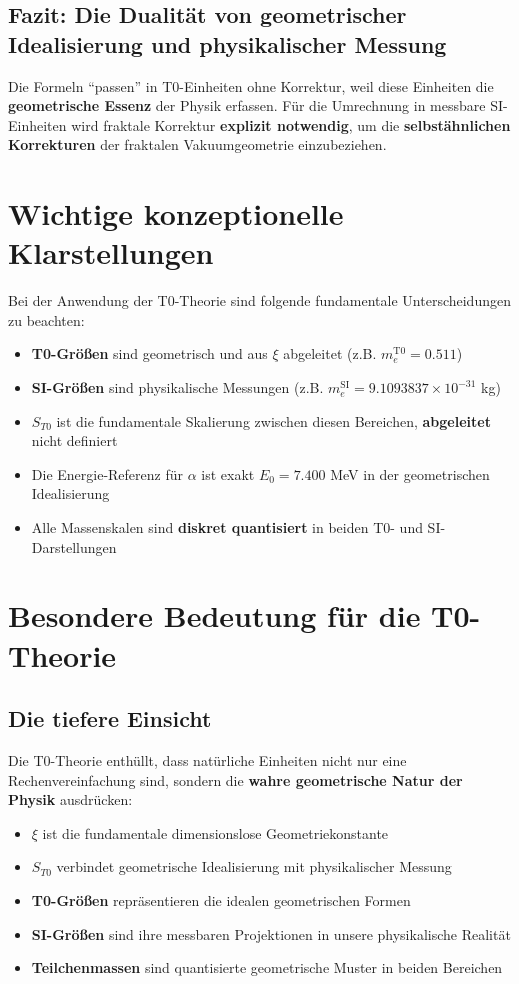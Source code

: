 	\subsection{Fazit: Die Dualität von geometrischer Idealisierung und physikalischer Messung}
	
	Die Formeln ``passen'' in T0-Einheiten ohne Korrektur, weil diese Einheiten die \textbf{geometrische Essenz} der Physik erfassen. Für die Umrechnung in messbare SI-Einheiten wird fraktale Korrektur \textbf{explizit notwendig}, um die \textbf{selbstähnlichen Korrekturen} der fraktalen Vakuumgeometrie einzubeziehen.
	
	\section{Wichtige konzeptionelle Klarstellungen}
	
	Bei der Anwendung der T0-Theorie sind folgende fundamentale Unterscheidungen zu beachten:
	
	\begin{itemize}
		\item \textbf{T0-Größen} sind geometrisch und aus $\xi$ abgeleitet (z.B. $m_e^{\mathrm{T0}} = 0.511$)
		\item \textbf{SI-Größen} sind physikalische Messungen (z.B. $m_e^{\mathrm{SI}} = 9.1093837\times 10^{-31}$ kg)
		\item \textbf{$S_{T0}$} ist die fundamentale Skalierung zwischen diesen Bereichen, \textbf{abgeleitet} nicht definiert
		\item Die Energie-Referenz für $\alpha$ ist exakt $E_0 = 7.400$ MeV in der geometrischen Idealisierung
		\item Alle Massenskalen sind \textbf{diskret quantisiert} in beiden T0- und SI-Darstellungen
	\end{itemize}
	
	\section{Besondere Bedeutung für die T0-Theorie}
	
	\subsection{Die tiefere Einsicht}
	Die T0-Theorie enthüllt, dass natürliche Einheiten nicht nur eine Rechenvereinfachung sind, sondern die \textbf{wahre geometrische Natur der Physik} ausdrücken:
	\begin{itemize}
		\item \textbf{$\xi$} ist die fundamentale dimensionslose Geometriekonstante
		\item \textbf{$S_{T0}$} verbindet geometrische Idealisierung mit physikalischer Messung
		\item \textbf{T0-Größen} repräsentieren die idealen geometrischen Formen
		\item \textbf{SI-Größen} sind ihre messbaren Projektionen in unsere physikalische Realität
		\item \textbf{Teilchenmassen} sind quantisierte geometrische Muster in beiden Bereichen
	\end{itemize}
	
